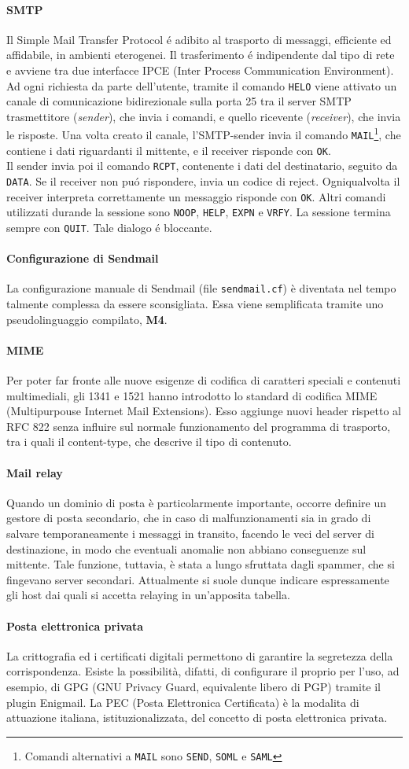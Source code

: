 \documentclass[a4paper,11pt]{article}
\def\code#1{\texttt{#1}}
\def\para#1{\paragraph{#1}\label{#1}}
\def\vedi#1{\nameref{#1}}
\begin{document}
\para{SMTP} Il Simple Mail Transfer Protocol  \'e adibito al trasporto di messaggi, efficiente ed affidabile, in ambienti eterogenei. Il trasferimento \'e indipendente dal tipo di rete e avviene tra due interfacce IPCE (Inter Process Communication Environment). Ad ogni richiesta da parte dell'utente, tramite il comando \code{HELO} viene attivato un canale di comunicazione bidirezionale sulla porta 25 tra il server SMTP trasmettitore (\textit{sender}), che invia i comandi, e quello ricevente (\textit{receiver}), che invia le risposte.
Una volta creato il canale, l'SMTP-sender invia il comando \code{MAIL}\footnote{Comandi alternativi a \code{MAIL} sono \code{SEND}, \code{SOML} e \code{SAML}}, che contiene i dati riguardanti il mittente, e il receiver risponde con \code{OK}.\\
Il sender invia poi il comando \code{RCPT}, contenente i dati del destinatario, seguito da \code{DATA}. Se il receiver non pu\'o rispondere, invia un codice di reject. Ogniqualvolta il receiver interpreta correttamente un messaggio risponde con \code{OK}. Altri comandi utilizzati durande la sessione sono \code{NOOP}, \code{HELP}, \code{EXPN} e \code{VRFY}. La sessione termina sempre con \code{QUIT}. Tale dialogo \'e bloccante. 
\para{Configurazione di Sendmail}
La configurazione manuale di Sendmail (file \code{sendmail.cf}) è diventata nel tempo talmente complessa da essere sconsigliata. Essa viene semplificata tramite uno pseudolinguaggio compilato, \textbf{M4}.
\para{MIME}
Per poter far fronte alle nuove esigenze di codifica di caratteri speciali e contenuti multimediali, gli \vedi{RFC} 1341 e 1521 hanno introdotto lo standard di codifica MIME (Multipurpouse Internet Mail Extensions). Esso aggiunge nuovi header rispetto al RFC 822 senza influire sul normale funzionamento del programma di trasporto, tra i quali il content-type, che descrive il tipo di contenuto. 
\para{Mail relay} Quando un dominio di posta è particolarmente importante, occorre definire un gestore di posta secondario, che in caso di malfunzionamenti sia in grado di salvare temporaneamente i messaggi in transito, facendo le veci del server di destinazione, in modo che eventuali anomalie non abbiano conseguenze sul mittente.
Tale funzione, tuttavia, è stata a lungo sfruttata dagli spammer, che si fingevano server secondari. Attualmente si suole dunque indicare espressamente gli host dai quali si accetta relaying in un'apposita tabella.
\para{Posta elettronica privata}
La crittografia ed i certificati digitali permettono di garantire la segretezza della corrispondenza. Esiste la possibilità, difatti, di configurare il proprio \vedi{MUA} per l'uso, ad esempio, di GPG (GNU Privacy Guard, equivalente libero di PGP) tramite il plugin Enigmail. La PEC (Posta Elettronica Certificata) è la modalita di attuazione italiana, istituzionalizzata, del concetto di posta elettronica privata.
\end{document}
